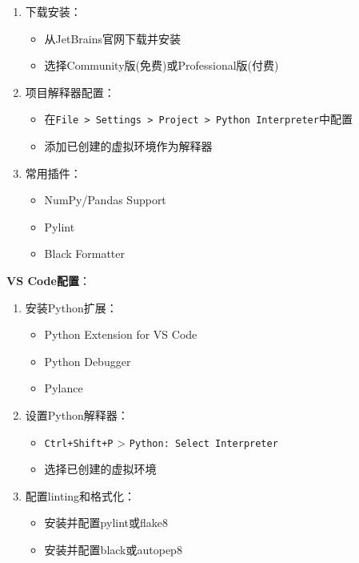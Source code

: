 \begin{enumerate}
\def\labelenumi{\arabic{enumi}.}
\tightlist
\item
  下载安装：

  \begin{itemize}
  \tightlist
  \item
    从JetBrains官网下载并安装
  \item
    选择Community版(免费)或Professional版(付费)
  \end{itemize}
\item
  项目解释器配置：

  \begin{itemize}
  \tightlist
  \item
    在\passthrough{\lstinline!File > Settings > Project > Python Interpreter!}中配置
  \item
    添加已创建的虚拟环境作为解释器
  \end{itemize}
\item
  常用插件：

  \begin{itemize}
  \tightlist
  \item
    NumPy/Pandas Support
  \item
    Pylint
  \item
    Black Formatter
  \end{itemize}
\end{enumerate}

\textbf{VS Code配置}：

\begin{enumerate}
\def\labelenumi{\arabic{enumi}.}
\tightlist
\item
  安装Python扩展：

  \begin{itemize}
  \tightlist
  \item
    Python Extension for VS Code
  \item
    Python Debugger
  \item
    Pylance
  \end{itemize}
\item
  设置Python解释器：

  \begin{itemize}
  \tightlist
  \item
    \passthrough{\lstinline!Ctrl+Shift+P!} \textgreater{}
    \passthrough{\lstinline!Python: Select Interpreter!}
  \item
    选择已创建的虚拟环境
  \end{itemize}
\item
  配置linting和格式化：

  \begin{itemize}
  \tightlist
  \item
    安装并配置pylint或flake8
  \item
    安装并配置black或autopep8
  \end{itemize}
\end{enumerate}

